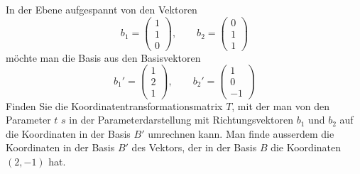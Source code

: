 \begin{beispiel}
In der Ebene aufgespannt von den Vektoren 
\[
b_1=\begin{pmatrix}1\\1\\0 \end{pmatrix}
,\qquad
b_2=\begin{pmatrix}0\\1\\1 \end{pmatrix}
\]
möchte man die Basis aus den Basisvektoren
\[
b_1'=\begin{pmatrix}1\\2\\1\end{pmatrix}
,\qquad
b_2'=\begin{pmatrix}1\\0\\-1\end{pmatrix}
\]
Finden Sie die Koordinatentransformationsmatrix $T$, mit der
man von den Parameter $t$ $s$ in der Parameterdarstellung
mit Richtungsvektoren $b_1$ und $b_2$ auf die Koordinaten in
der Basis $B'$ umrechnen kann.
Man finde ausserdem die 
Koordinaten in der Basis $B'$ des Vektors, der in der Basis $B$
die Koordinaten $(2,-1)$ hat.


\end{beispiel}
